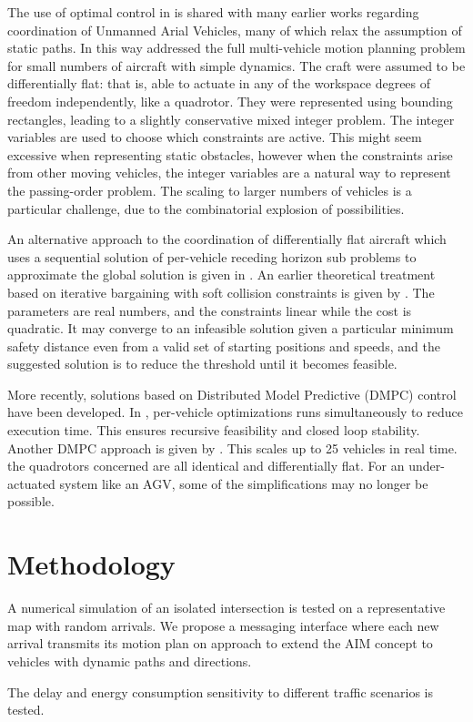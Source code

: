 The use of optimal control in \cite{DeCampos2017} is shared with many earlier works regarding coordination of Unmanned Arial Vehicles, many of which relax the assumption of static paths. In this way \cite{Schouwenaars2004} addressed the full multi-vehicle motion planning problem for small numbers of aircraft with simple dynamics. The craft were assumed to be differentially flat: that is, able to actuate in any of the workspace degrees of freedom independently, like a quadrotor. They were represented using bounding rectangles, leading to a slightly conservative mixed integer problem. The integer variables are used to choose which constraints are active. This might seem excessive when representing static obstacles, however when the constraints arise from other moving vehicles, the integer variables are a natural way to represent the passing-order problem. The scaling to larger numbers of vehicles is a particular challenge, due to the combinatorial explosion of possibilities.

An alternative approach to the coordination of differentially flat aircraft which uses a sequential solution of per-vehicle receding horizon sub problems to approximate the global solution is given in \cite{Keviczky2008}. An earlier theoretical treatment based on iterative bargaining with soft collision constraints is given by \cite{Inalhan2002}. The parameters are real numbers, and the constraints linear while the cost is quadratic. It may converge to an infeasible solution given a particular minimum safety distance even from a valid set of starting positions and speeds, and the suggested solution is to reduce the threshold until it becomes feasible.  

More recently, solutions based on Distributed Model Predictive (DMPC) control have been developed. In \cite{Dai2017}, per-vehicle optimizations runs simultaneously to reduce execution time. This ensures recursive feasibility and closed loop stability. Another DMPC approach is given by \cite{Luis2018}. This scales up to 25 vehicles in real time. the quadrotors concerned are all identical and differentially flat. For an under-actuated system like an AGV, some of the simplifications may no longer be possible.

\section{Methodology} 
A numerical simulation of an isolated intersection is tested on a representative map with random arrivals. We propose a messaging interface where each new arrival transmits its motion plan on approach to extend the AIM concept to vehicles with dynamic paths and directions.

The delay and energy consumption sensitivity to different traffic scenarios is tested.  